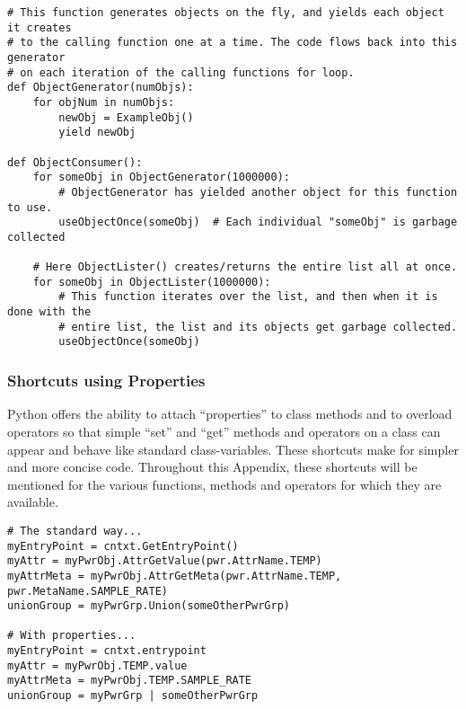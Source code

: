\documentclass[12pt]{report} %
\begin{document}
\begin{appendices}
\begin{center}
\begin{minipage}{.95\linewidth}
\begin{lstlisting}
# This function generates objects on the fly, and yields each object it creates
# to the calling function one at a time. The code flows back into this generator
# on each iteration of the calling functions for loop.
def ObjectGenerator(numObjs):
    for objNum in numObjs:
        newObj = ExampleObj()
        yield newObj

def ObjectConsumer():
    for someObj in ObjectGenerator(1000000):
        # ObjectGenerator has yielded another object for this function to use.
        useObjectOnce(someObj)  # Each individual "someObj" is garbage collected

    # Here ObjectLister() creates/returns the entire list all at once.
    for someObj in ObjectLister(1000000):
        # This function iterates over the list, and then when it is done with the
        # entire list, the list and its objects get garbage collected.
        useObjectOnce(someObj)

\end{lstlisting}\end{minipage}\end{center}

\subsubsection{Shortcuts using Properties}\label{sec:PythonShortcutsProperties}
Python offers the ability to attach ``properties'' to class methods and to
overload operators so that simple ``set'' and ``get'' methods and operators
on a class can appear and behave like standard class-variables. These
shortcuts make for simpler and more concise code. Throughout this Appendix,
these shortcuts will be mentioned for the various functions, methods and
operators for which they are available.
\begin{center}\begin{minipage}{.95\linewidth}\begin{lstlisting}
# The standard way...
myEntryPoint = cntxt.GetEntryPoint()
myAttr = myPwrObj.AttrGetValue(pwr.AttrName.TEMP)
myAttrMeta = myPwrObj.AttrGetMeta(pwr.AttrName.TEMP, pwr.MetaName.SAMPLE_RATE)
unionGroup = myPwrGrp.Union(someOtherPwrGrp)

# With properties...
myEntryPoint = cntxt.entrypoint
myAttr = myPwrObj.TEMP.value
myAttrMeta = myPwrObj.TEMP.SAMPLE_RATE
unionGroup = myPwrGrp | someOtherPwrGrp
\end{lstlisting}\end{minipage}\end{center}


\end{appendices}
\end{document}
